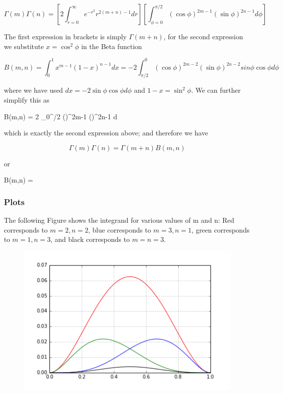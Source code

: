 \[
\Gamma(m) \Gamma(n) = \left[ 2 \int_{r=0}^\infty e^{-r^2} r^{2(m+n)-1} dr \right] \left[  \int_{\phi=0}^{\pi/2}   (\cos \phi)^{2m-1} (\sin \phi)^{2n-1} d \phi \right]
\]

The first expression in brackets is simply \(\Gamma(m+n)\), for the
second expression we substitute \(x=\cos^2 \phi\) in the Beta function

\[
B(m,n) = \int_0^1 x^{m-1} (1-x)^{n-1} dx = -2 \int_{\pi/2}^0 (\cos \phi)^{2m-2} (\sin \phi)^{2n-2} sin\phi \cos\phi d\phi
\]

where we have used \(dx = -2 \sin \phi \cos \phi d \phi\) and
\(1 - x = \sin^2 \phi\). We can further simplify this as

\bee
B(m,n) = 2 \int_0^{\pi/2} (\cos \phi)^{2m-1} (\sin \phi)^{2n-1} d\phi
\eee

which is exactly the second expression above; and therefore we have

\[
\Gamma(m) \Gamma(n) = \Gamma(m+n) B(m,n)
\]

or

\bee
B(m,n) = 
\eee

\subsubsection{Plots}

The following Figure shows the integrand for various values of m and n:
Red corresponds to \(m=2, n=2\), blue corresponds to \(m=3, n=1\), green
corresponds to \(m=1, n=3\), and black corresponds to \(m=n=3\).

\begin{figure}[H]
\centering
\includegraphics{images/interesting_integrals_05_2.png}

\end{figure}

